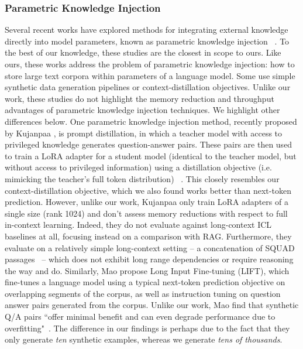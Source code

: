 \subsubsection{Parametric Knowledge Injection}
Several recent works have explored methods for integrating external knowledge directly into model parameters, known as parametric knowledge injection ~\cite{kujanpaa2024knowledge,mao2025lift,su2025parametricrag,caccia2025training,kuratov2025cramming}.
To the best of our knowledge, these studies are the closest in scope to ours.
Like ours, these works address the problem of parametric knowledge injection: how to store large text corpora within parameters of a language model.
Some use simple synthetic data generation pipelines or context-distillation objectives.
Unlike our work, these studies do not highlight the memory reduction and throughput advantages of parametric knowledge injection techniques.
We highlight other differences below.
One parametric knowledge injection method, recently proposed by Kujanpaa \etal, is prompt distillation, in which a teacher model with access to privileged knowledge generates question-answer pairs. These pairs are then used to train a LoRA adapter for a student model (identical to the teacher model, but without access to privileged information) using a distillation objective (i.e. mimicking the teacher's full token distribution) ~\cite{kujanpaa2024knowledge}.
This closely resembles our context-distillation objective, which we also found works better than next-token prediction.
However, unlike our work, Kujanpaa \etal only train LoRA adapters of a single size (rank 1024) and don't assess memory reductions with respect to full in-context learning.
Indeed, they do not evaluate against long-context ICL baselines at all, focusing instead on a comparison with RAG.
Furthermore, they evaluate on a relatively simple long-context setting -- a concatenation of SQUAD passages~\cite{rajpurkar2016squad} -- which does not exhibit long range dependencies or require reasoning the way \mtob and \longhealth do.
Similarly, Mao \etal propose Long Input Fine-tuning (LIFT), which fine-tunes a language model using a typical next-token prediction objective on overlapping segments of the corpus, as well as instruction tuning on question answer pairs generated from the corpus.
Unlike our work, Mao \etal find that synthetic Q/A pairs ``offer minimal benefit and can even degrade performance due to overfitting"~\cite{mao2025lift}.
The difference in our findings is perhaps due to the fact that they only generate \textit{ten} synthetic examples, whereas we generate \textit{tens of thousands}.

